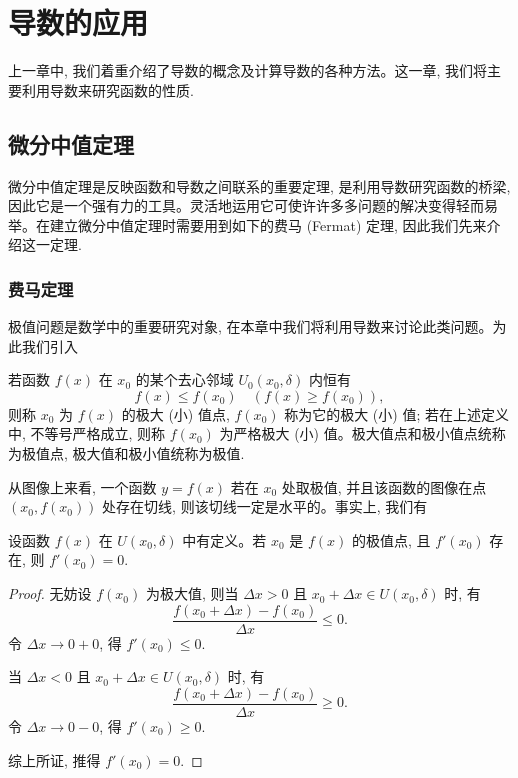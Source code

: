 \setcounter{chapter}{4} %
\chapter{导数的应用}
\label{chap:ma-5}

上一章中, 我们着重介绍了导数的概念及计算导数的各种方法。这一章, 我们将主要利用导数来研究函数的性质.

\section{微分中值定理}
\label{sec:ma-5-1}

微分中值定理是反映函数和导数之间联系的重要定理, 是利用导数研究函数的桥梁, 因此它是一个强有力的工具。灵活地运用它可使许许多多问题的解决变得轻而易举。在建立微分中值定理时需要用到如下的费马 (Fermat) 定理, 因此我们先来介绍这一定理.

\subsection{费马定理}
\label{subsec:ma-5-1-1}

极值问题是数学中的重要研究对象, 在本章中我们将利用导数来讨论此类问题。为此我们引入

\begin{definition}\label{definition:ma-5-1-1}
若函数 $f(x)$ 在 $x_0$ 的某个去心邻域 $U_0(x_0,\delta)$ 内恒有
\[
  f(x)\leqslant f(x_0)\quad (f(x)\geqslant f(x_0)),
\]
则称 $x_0$ 为 $f(x)$ 的极大 (小) 值点, $f(x_0)$ 称为它的极大 (小) 值; 若在上述定义中, 不等号严格成立, 则称 $f(x_0)$ 为严格极大 (小) 值。极大值点和极小值点统称为极值点, 极大值和极小值统称为极值.
\end{definition}

从图像上来看, 一个函数 $y=f(x)$ 若在 $x_0$ 处取极值, 并且该函数的图像在点 $(x_0,f(x_0))$ 处存在切线, 则该切线一定是水平的。事实上, 我们有

\begin{theorem}[{费马定理}]\label{theorem:ma-5-1-1}
设函数 $f(x)$ 在 $U(x_0,\delta)$ 中有定义。若 $x_0$ 是 $f(x)$ 的极值点, 且 $f'(x_0)$ 存在, 则 $f'(x_0)=0$.
\end{theorem}


\begin{proof}
无妨设 $f(x_0)$ 为极大值, 则当 $\Delta x>0$ 且 $x_0+\Delta x\in U(x_0,\delta)$ 时, 有
\[
  \frac{f(x_0+\Delta x)-f(x_0)}{\Delta x}\leqslant0.
\]
令 $\Delta x\to0+0$, 得 $f'(x_0)\leqslant0$.

当 $\Delta x<0$ 且 $x_0+\Delta x\in U(x_0,\delta)$ 时, 有
\[
  \frac{f(x_0+\Delta x)-f(x_0)}{\Delta x}\geqslant0.
\]
令 $\Delta x\to0-0$, 得 $f'(x_0)\geqslant0$.

综上所证, 推得 $f'(x_0)=0$.
\end{proof}


